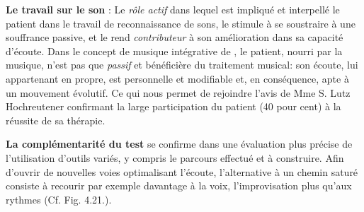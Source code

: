  \textbf{Le travail sur le son} :
 Le \emph{rôle actif} dans lequel est impliqué et interpellé le patient dans le travail
de reconnaissance de sons, le stimule à se soustraire à une souffrance
passive, et  le rend  \textit{contributeur} à son amélioration dans sa capacité
d'écoute.
Dans le concept de musique intégrative de \autocite[Cf.]
        {vrait_musicotherapie_2018}, le patient, nourri par
        la musique, n'est pas que \textit{passif }et
        bénéficière du traitement musical: son écoute, lui
        appartenant en propre, est personnelle et modifiable %
        et, en conséquence, apte à un mouvement évolutif.
Ce qui nous permet de rejoindre l'avis de Mme S. Lutz
 Hochreutener confirmant la large participation du patient (40 pour cent) à la réussite de sa thérapie.

 
  


 \textbf{La complémentarité du test} se confirme dans une évaluation plus
 précise de l'utilisation d'outils variés, y compris  le parcours effectué et à
 construire.
 Afin d'ouvrir de nouvelles
 voies optimalisant l'écoute, l'alternative à un chemin saturé
 consiste à recourir par exemple davantage  à la voix, l'improvisation
 plus qu'aux rythmes (Cf. Fig. 4.21.).

